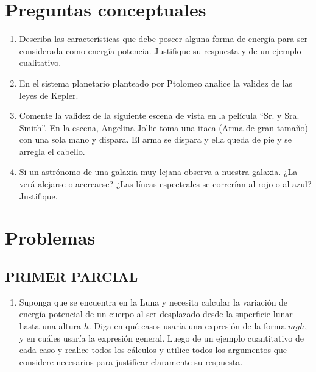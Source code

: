 \documentclass[a4paper,12pt]{article}
\begin{document}
\section*{Preguntas conceptuales}

\begin{enumerate}

\item Describa las características que debe poseer alguna forma de energía para
ser considerada como energía potencia. Justifique su respuesta y de un ejemplo
cualitativo. 

\item En el sistema planetario planteado por Ptolomeo analice la validez de las
leyes de Kepler.

\item Comente la validez de la siguiente escena de vista en la película ``Sr. y
Sra. Smith''. En la escena, Angelina Jollie toma una itaca (Arma de gran
tamaño) con una sola mano y dispara. El arma se dispara y ella queda de pie y
se arregla el cabello.

\item Si un astrónomo de una galaxia muy lejana observa a nuestra galaxia. ¿La
verá alejarse o acercarse? ¿Las líneas espectrales se correrían al rojo o al
azul? Justifique.


\end{enumerate}

\section*{Problemas}

\subsection*{PRIMER PARCIAL}

\begin{enumerate}

\item Suponga que se encuentra en la Luna y necesita calcular la variación de
energía potencial de un cuerpo al ser desplazado desde la superficie lunar
hasta una altura $h$. Diga en qué casos usaría una expresión de la forma $mgh$,
y en cuáles usaría la expresión general. Luego de un ejemplo cuantitativo de
cada caso y realice todos los cálculos y utilice todos los argumentos que
considere necesarios para justificar claramente su respuesta.

\end{enumerate}
\end{document}
